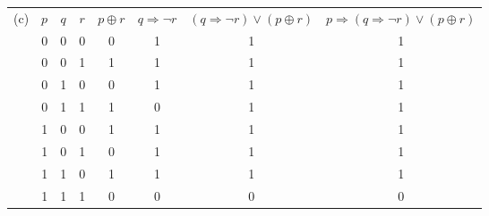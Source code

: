\documentclass[a4paper, 12pt]{article}  %
\begin{document}
\begin{table}[H]
    \begin{tabular}[H]{c|c|c|c|c|c|c|c|}
        (c) & $p$ & $q$ & $r$ & $p \oplus  r$ & $q \Rightarrow \neg r$ & $(q \Rightarrow \neg r) \lor (p \oplus r)$ & $p \Rightarrow (q \Rightarrow \neg r) \lor (p \oplus r)$ \\
            & 0   & 0   & 0   & 0             & 1                      & 1                                          & 1                                                        \\
            & 0   & 0   & 1   & 1             & 1                      & 1                                          & 1                                                        \\
            & 0   & 1   & 0   & 0             & 1                      & 1                                          & 1                                                        \\
            & 0   & 1   & 1   & 1             & 0                      & 1                                          & 1                                                        \\
            & 1   & 0   & 0   & 1             & 1                      & 1                                          & 1                                                        \\
            & 1   & 0   & 1   & 0             & 1                      & 1                                          & 1                                                        \\
            & 1   & 1   & 0   & 1             & 1                      & 1                                          & 1                                                        \\
            & 1   & 1   & 1   & 0             & 0                      & 0                                          & 0                                                        \\
    \end{tabular}
\end{table}
\end{document}
